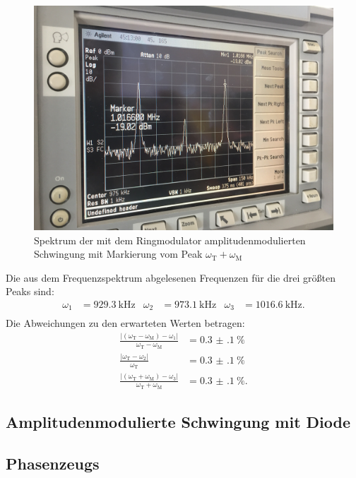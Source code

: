 \begin{figure}[H]
  \includegraphics[width=\textwidth]{Spektrum_Pics/b3.jpg}
  \caption{Spektrum der mit dem Ringmodulator amplitudenmodulierten Schwingung mit Markierung vom Peak $\omega_\text{T} + \omega_\text{M}$}
  \label{fig:b3}
\end{figure}

Die aus dem Frequenzspektrum abgelesenen Frequenzen für die drei größten Peaks sind:
\begin{align*}
  \omega_1 &= \SI{929.3}{\kilo\hertz} & \omega_2 &= \SI{973.1}{\kilo\hertz} & \omega_3 &= \SI{1016.6}{\kilo\hertz}.\\
\end{align*}
Die Abweichungen zu den erwarteten Werten betragen:
\begin{align*}
  \frac{|(\omega_\text{T} - \omega_\text{M}) - \omega_1|}{\omega_\text{T} - \omega_\text{M}} &= \SI{0.3(1)}{\percent}\\
  \frac{|\omega_\text{T} - \omega_2|}{\omega_\text{T}} &= \SI{0.3(1)}{\percent}\\
  \frac{|(\omega_\text{T} + \omega_\text{M}) - \omega_3|}{\omega_\text{T} + \omega_\text{M}} &= \SI{0.3(1)}{\percent}.
\end{align*}

\subsection{Amplitudenmodulierte Schwingung mit Diode}


\subsection{Phasenzeugs}

